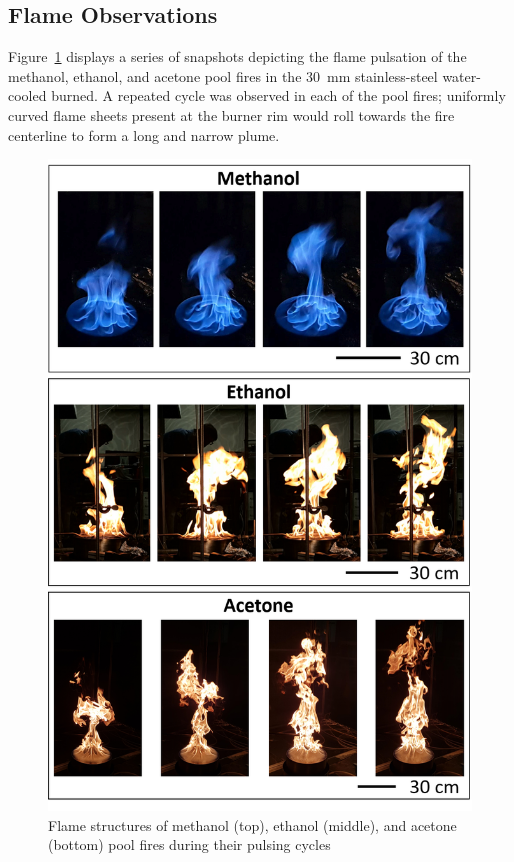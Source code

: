 \documentclass[12pt]{article}
\begin{document}
\subsection{Flame Observations}
\label{ssec:Flame_Observations}

Figure~\ref{fig:Flame_Structure} displays a series of snapshots depicting the flame pulsation of the methanol, ethanol, and acetone pool fires in the \SI{30}{mm} stainless-steel water-cooled burned. A repeated cycle was observed in each of the pool fires; uniformly curved flame sheets present at the burner rim would roll towards the fire centerline to form a long and narrow plume.
\begin{figure}[!]
	\centering
\includegraphics[width=12.0cm,keepaspectratio]{Flame_Structure.png}
	\caption[Pool Fire Structures]{Flame structures of methanol (top), ethanol (middle), and acetone (bottom) pool fires during their pulsing cycles}
	\label{fig:Flame_Structure}
\end{figure}
\end{document}
